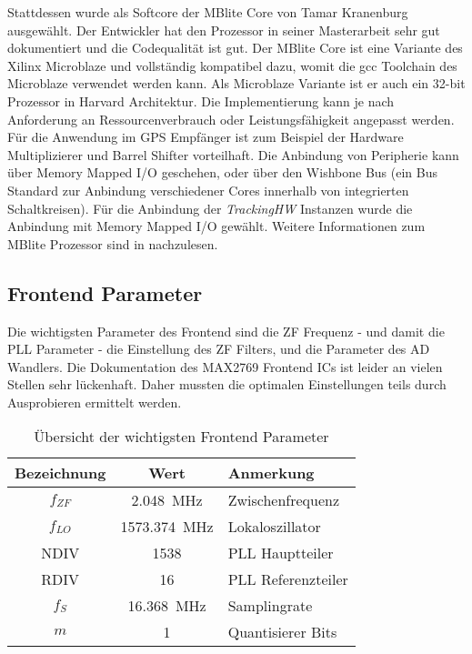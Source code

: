 Stattdessen wurde als Softcore der MBlite Core von Tamar Kranenburg ausgewählt. Der Entwickler hat den Prozessor in seiner Masterarbeit \cite{MBliteThesis} sehr gut dokumentiert und die Codequalität ist gut. Der MBlite Core ist eine Variante des Xilinx Microblaze und vollständig kompatibel dazu, womit die gcc Toolchain des Microblaze verwendet werden kann. Als Microblaze Variante ist er auch ein 32-bit Prozessor in Harvard Architektur. Die Implementierung kann je nach Anforderung an Ressourcenverbrauch oder Leistungsfähigkeit angepasst werden. Für die Anwendung im GPS Empfänger ist zum Beispiel der Hardware Multiplizierer und Barrel Shifter vorteilhaft. Die Anbindung von Peripherie kann über Memory Mapped I/O geschehen, oder über den Wishbone Bus (ein Bus Standard zur Anbindung verschiedener Cores innerhalb von integrierten Schaltkreisen). Für die Anbindung der \emph{TrackingHW} Instanzen wurde die Anbindung mit Memory Mapped I/O gewählt. Weitere Informationen zum MBlite Prozessor sind in \cite{MBliteThesis} nachzulesen.

\subsection{Frontend Parameter}
Die wichtigsten Parameter des Frontend sind die ZF Frequenz - und damit die PLL Parameter - die Einstellung des ZF Filters, und die Parameter des AD Wandlers. Die Dokumentation des MAX2769 Frontend ICs ist leider an vielen Stellen sehr lückenhaft. Daher mussten die optimalen Einstellungen teils durch Ausprobieren ermittelt werden.

\begin{table}[htbp]
    \ttabbox
    {
        \caption[Zusammenfassung Frontend Parameter]{Übersicht der wichtigsten Frontend Parameter}
        \label{TabFrontendParams}
    }
    {
    \begin{tabular}{c S l}
        \toprule
        Bezeichnung             &  {Wert} & Anmerkung\\
        \midrule
        $f_{ZF}$      & \SI{2.048}{\MHz}      & Zwischenfrequenz\\
        $f_{LO}$      & \SI{1573.374}{\MHz}   & Lokaloszillator\\
        NDIV        & \num{1538}            & PLL Hauptteiler\\
        RDIV        & \num{16}              & PLL Referenzteiler\\
        $f_S$       & \SI{16.368}{\MHz}     & Samplingrate \\
        $m$           & \num{1}               & Quantisierer Bits \\
        \bottomrule
    \end{tabular}
    }
\end{table}


